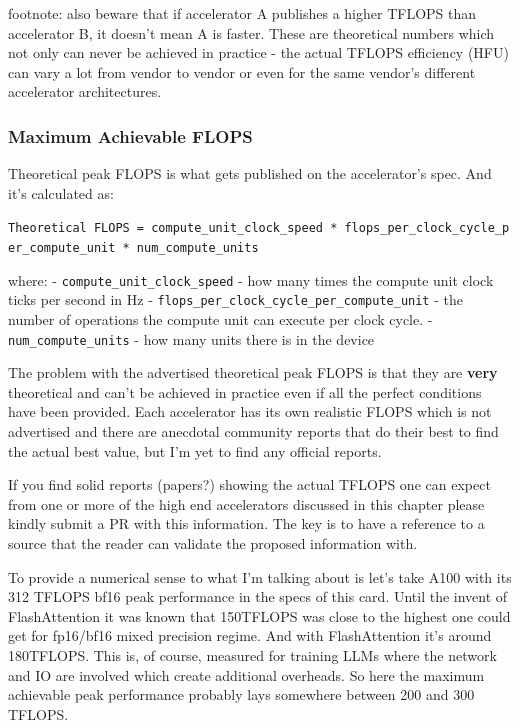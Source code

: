 \documentclass[
]{report}
\begin{document}
footnote: also beware that if accelerator A publishes a higher TFLOPS
than accelerator B, it doesn't mean A is faster. These are theoretical
numbers which not only can never be achieved in practice - the actual
TFLOPS efficiency (HFU) can vary a lot from vendor to vendor or even for
the same vendor's different accelerator architectures.

\subsubsection{Maximum Achievable FLOPS}\label{maximum-achievable-flops}

Theoretical peak FLOPS is what gets published on the accelerator's spec.
And it's calculated as:

\texttt{Theoretical\ FLOPS\ =\ compute\_unit\_clock\_speed\ *\ flops\_per\_clock\_cycle\_per\_compute\_unit\ *\ num\_compute\_units}

where: - \texttt{compute\_unit\_clock\_speed} - how many times the
compute unit clock ticks per second in Hz -
\texttt{flops\_per\_clock\_cycle\_per\_compute\_unit} - the number of
operations the compute unit can execute per clock cycle. -
\texttt{num\_compute\_units} - how many units there is in the device

The problem with the advertised theoretical peak FLOPS is that they are
\textbf{very} theoretical and can't be achieved in practice even if all
the perfect conditions have been provided. Each accelerator has its own
realistic FLOPS which is not advertised and there are anecdotal
community reports that do their best to find the actual best value, but
I'm yet to find any official reports.

If you find solid reports (papers?) showing the actual TFLOPS one can
expect from one or more of the high end accelerators discussed in this
chapter please kindly submit a PR with this information. The key is to
have a reference to a source that the reader can validate the proposed
information with.

To provide a numerical sense to what I'm talking about is let's take
A100 with its 312 TFLOPS bf16 peak performance in the specs of this
card. Until the invent of FlashAttention it was known that 150TFLOPS was
close to the highest one could get for fp16/bf16 mixed precision regime.
And with FlashAttention it's around 180TFLOPS. This is, of course,
measured for training LLMs where the network and IO are involved which
create additional overheads. So here the maximum achievable peak
performance probably lays somewhere between 200 and 300 TFLOPS.
\end{document}

